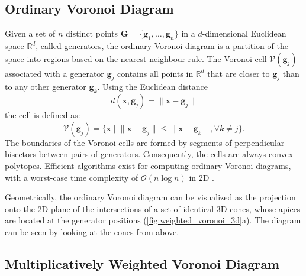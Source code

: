 \documentclass[fleqn,usenatbib]{mnras}
\newcommand{\norm}[1]{\lVert#1\rVert}
\begin{document}
\subsection{Ordinary Voronoi Diagram}

Given a set of $n$ distinct points $\mathbf{G}=\{\mathbf{g}_1,\ldots,\mathbf{g}_n\}$ in a $d$-dimensional Euclidean space $\mathbb{R}^d$, called generators, the ordinary Voronoi diagram is a partition of the space into regions based on the nearest-neighbour rule. The Voronoi cell $\mathcal{V}(\mathbf{g}_j)$ associated with a generator $\mathbf{g}_j$ contains all points in $\mathbb{R}^d$ that are closer to $\mathbf{g}_j$ than to any other generator $\mathbf{g}_k$. Using the Euclidean distance 
\begin{equation}
    d(\mathbf{x},\mathbf{g}_j)=\norm{\mathbf{x} - \mathbf{g}_j}
\end{equation}
the cell is defined as:
\begin{equation}
    \mathcal{V}(\mathbf{g}_j)=\{\mathbf{x} \mid \norm{\mathbf{x} - \mathbf{g}_j}\leq \norm{\mathbf{x} - \mathbf{g}_k}, \forall k \neq j\}.
\end{equation}
The boundaries of the Voronoi cells are formed by segments of perpendicular bisectors between pairs of generators. Consequently, the cells are always convex polytopes. Efficient algorithms exist for computing ordinary Voronoi diagrams, with a worst-case time complexity of $\mathcal{O}(n\log n)$ in 2D \citep[e.g., Chapter 3 of][]{Aurenhammer2013}.

Geometrically, the ordinary Voronoi diagram can be visualized as the projection onto the 2D plane of the intersections of a set of identical 3D cones, whose apices are located at the generator positions (\autoref{fig:weighted_voronoi_3d}a). The diagram can be seen by looking at the cones from above.

\subsection{Multiplicatively Weighted Voronoi Diagram}
\end{document}
